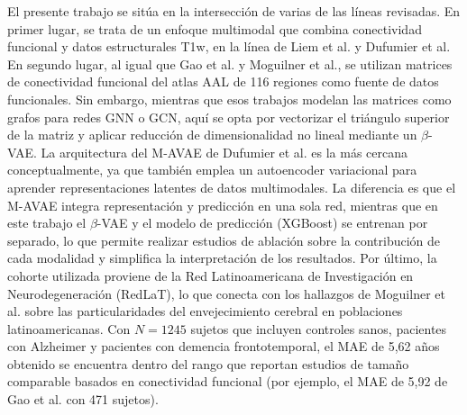 El presente trabajo se sitúa en la intersección de varias de las líneas revisadas. En primer lugar, se trata de un enfoque multimodal que combina conectividad funcional y datos estructurales T1w, en la línea de Liem et al. y Dufumier et al. En segundo lugar, al igual que Gao et al. y Moguilner et al., se utilizan matrices de conectividad funcional del atlas AAL de 116 regiones como fuente de datos funcionales. Sin embargo, mientras que esos trabajos modelan las matrices como grafos para redes GNN o GCN, aquí se opta por vectorizar el triángulo superior de la matriz y aplicar reducción de dimensionalidad no lineal mediante un $\beta$-VAE. La arquitectura del M-AVAE de Dufumier et al. \cite{dufumier2024multi} es la más cercana conceptualmente, ya que también emplea un autoencoder variacional para aprender representaciones latentes de datos multimodales. La diferencia es que el M-AVAE integra representación y predicción en una sola red, mientras que en este trabajo el $\beta$-VAE y el modelo de predicción (XGBoost) se entrenan por separado, lo que permite realizar estudios de ablación sobre la contribución de cada modalidad y simplifica la interpretación de los resultados. Por último, la cohorte utilizada proviene de la Red Latinoamericana de Investigación en Neurodegeneración (RedLaT), lo que conecta con los hallazgos de Moguilner et al. sobre las particularidades del envejecimiento cerebral en poblaciones latinoamericanas. Con $N = 1245$ sujetos que incluyen controles sanos, pacientes con Alzheimer y pacientes con demencia frontotemporal, el MAE de 5,62 años obtenido se encuentra dentro del rango que reportan estudios de tamaño comparable basados en conectividad funcional (por ejemplo, el MAE de 5,92 de Gao et al. con 471 sujetos).